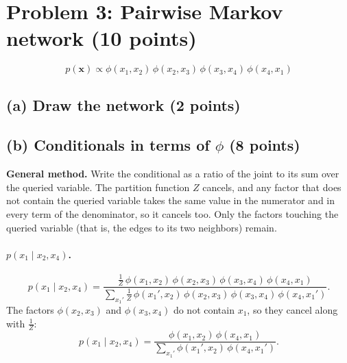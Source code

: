 \documentclass[11pt]{article}
\begin{document}
\section*{Problem 3: Pairwise Markov network (10 points)}

\[
  p(\mathbf{x}) \propto \phi(x_1,x_2)\,\phi(x_2,x_3)\,\phi(x_3,x_4)\,\phi(x_4,x_1)
\]

\subsection*{(a) Draw the network (2 points)}

\begin{center}
\end{center}

\subsection*{(b) Conditionals in terms of $\phi$ (8 points)}

\textbf{General method.} Write the conditional as a ratio of the joint to
its sum over the queried variable. The partition function $Z$ cancels, and
any factor that does not contain the queried variable takes the same value in
the numerator and in every term of the denominator, so it cancels too. Only
the factors touching the queried variable (that is, the edges to its two
neighbors) remain.

\paragraph{$p(x_1 \mid x_2, x_4)$.}
\[
  p(x_1 \mid x_2, x_4)
  = \frac{\tfrac1Z\,\phi(x_1,x_2)\,\phi(x_2,x_3)\,\phi(x_3,x_4)\,\phi(x_4,x_1)}
         {\sum_{x_1'}\tfrac1Z\,\phi(x_1',x_2)\,\phi(x_2,x_3)\,\phi(x_3,x_4)\,\phi(x_4,x_1')} .
\]
The factors $\phi(x_2,x_3)$ and $\phi(x_3,x_4)$ do not contain $x_1$, so they
cancel along with $\tfrac1Z$:
\[
  p(x_1 \mid x_2, x_4)
  = \frac{\phi(x_1,x_2)\,\phi(x_4,x_1)}{\sum_{x_1'}\phi(x_1',x_2)\,\phi(x_4,x_1')} .
\]
\end{document}
